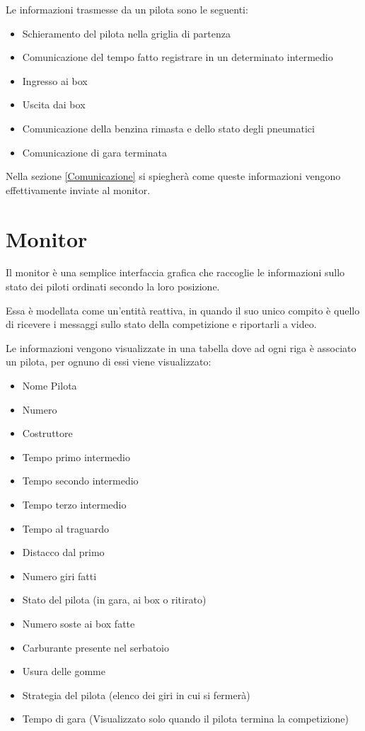 \documentclass[a4paper,11pt, twoside, openright]{book}
\begin{document}
	Le informazioni trasmesse da un pilota sono le seguenti:
	
	\begin{itemize}
	  \item Schieramento del pilota nella griglia di partenza
	  \item Comunicazione del tempo fatto registrare in un determinato intermedio
	  \item Ingresso ai box
	  \item Uscita dai box
	  \item Comunicazione della benzina rimasta e dello stato degli pneumatici
	  \item Comunicazione di gara terminata
	\end{itemize}
	
	Nella sezione \ref{Comunicazione} si spiegherà come queste informazioni vengono effettivamente inviate al monitor.
	
    \section{Monitor}
    \label{Monitor}
      Il monitor è una semplice interfaccia grafica che raccoglie le informazioni sullo stato dei piloti ordinati secondo
      la loro posizione.
      
      Essa è modellata come un'entità reattiva, in quando il suo unico compito è quello di ricevere i messaggi
      sullo stato della competizione e riportarli a video.
      
      Le informazioni vengono visualizzate in una tabella dove ad ogni riga è associato un pilota, per ognuno di essi
      viene visualizzato:
      \begin{itemize}
	\item Nome Pilota
	\item Numero
	\item Costruttore
	\item Tempo primo intermedio
	\item Tempo secondo intermedio
	\item Tempo terzo intermedio
	\item Tempo al traguardo
	\item Distacco dal primo
	\item Numero giri fatti
	\item Stato del pilota (in gara, ai box o ritirato)
	\item Numero soste ai box fatte
	\item Carburante presente nel serbatoio
	\item Usura delle gomme
	\item Strategia del pilota (elenco dei giri in cui si fermerà)
	\item Tempo di gara (Visualizzato solo quando il pilota termina la competizione)
      \end{itemize}
      
\end{document}
